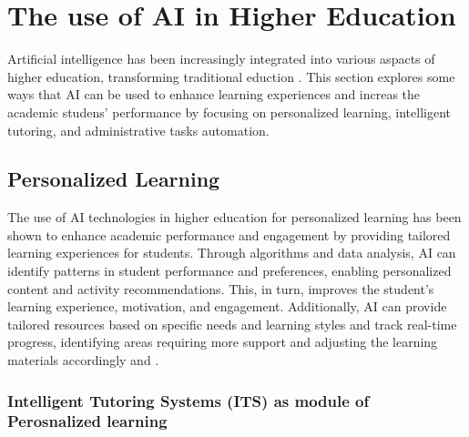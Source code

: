 \section{The use of AI in Higher Education }\label{use-ai}
\justifying
Artificial intelligence has been increasingly integrated into various aspacts of higher
education, transforming traditional eduction \citep{wang_exploring_2023}. This section explores
some ways that AI can be used to enhance learning experiences and increas the academic studens' performance
by focusing on  personalized learning, intelligent tutoring, and administrative tasks automation.

\subsection{Personalized Learning}
The use of AI technologies in higher education for personalized learning has been shown to enhance academic 
performance and engagement by providing tailored learning experiences for students. Through algorithms and data analysis, 
AI can identify patterns in student performance and preferences, enabling personalized content and activity recommendations. 
This, in turn, improves the student’s learning experience, motivation, and engagement. Additionally, AI can provide tailored 
resources based on specific needs and learning styles and track real-time progress, 
identifying areas requiring more support and adjusting the learning materials accordingly 
\citep{guerrero-quinonez_artificial_2023} and \citep{l_d_of_cs_akshara_first_grade_college_2023}.



\subsubsection{Intelligent Tutoring Systems (ITS) as module of Perosnalized learning}

